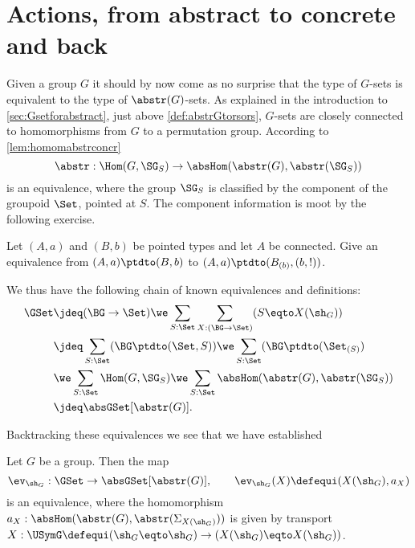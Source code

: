 \section{Actions, from abstract to concrete and back}
\label{sec:Gsetsabstrconcr}

Given a group $G$ it should by now come as no surprise that the type 
of $G$-sets is equivalent to the type of $\abstr(G)$-sets.
As explained in the introduction to \cref{sec:Gsetforabstract},
just above \cref{def:abstrGtorsors}, $G$-sets are closely
connected to homomorphisms from $G$ to a permutation group.
According to \cref{lem:homomabstrconcr}
$$\abstr:\Hom(G,\SG_S)\to\absHom(\abstr(G),\abstr(\SG_S))$$
is an equivalence, where the group $\SG_S$ is classified by the 
component of the groupoid $\Set$, pointed at $S$. 
The component information is moot by the following exercise.
\begin{xca}\label{xca:ptd-conn-to-comp}
Let $(A,a)$ and $(B,b)$ be pointed types and let $A$ be connected.
Give an equivalence from $(A,a)\ptdto(B,b)$ to
$(A,a)\ptdto(B_{(b)},(b,!))$.
\end{xca}
We thus have the following chain of known equivalences and definitions:
\begin{align*}
\GSet &\jdeq (\BG\to\Set) \we 
\sum_{S:\Set} \sum_{X:(\BG\to\Set)}(S\eqto X(\sh_G)) \\
&\jdeq \sum_{S:\Set} (\BG\ptdto(\Set,S))
\we \sum_{S:\Set} (\BG\ptdto(\Set_{(S)}) \\ 
&\we \sum_{S:\Set} \Hom(G,\SG_S)
\we\sum_{S:\Set} \absHom(\abstr(G),\abstr(\SG_S)) \\
&\jdeq \absGSet[\abstr(G)].
\end{align*}

Backtracking these equivalences we see that we have established
\begin{lemma}
  \label{lem:actionsconcreteandabstract}
  Let $G$ be a group.  Then the map
  $$\ev_{\sh_G}:\GSet\to\absGSet[\abstr(G)],\qquad \ev_{\sh_G}(X)\defequi(X(\sh_G),a_X)
$$
is an equivalence, where the homomorphism $a_X:\absHom(\abstr(G), \abstr(\Sigma_{X(\sh_G)}))$ is given by transport $X:\USymG\defequi(\sh_G\eqto \sh_G)\to (X(\sh_G)\eqto X(\sh_G))$.
\end{lemma}

{\Large{}}

